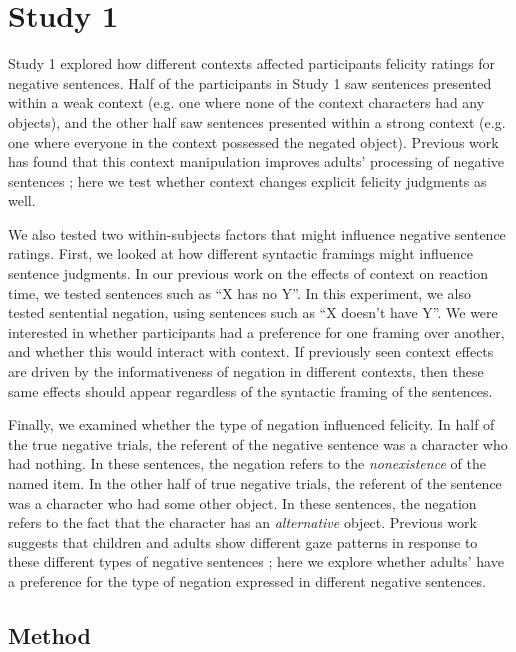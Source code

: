 \documentclass[10pt,letterpaper]{article}
\begin{document}
\section{Study 1}

Study 1 explored how different contexts affected participants felicity ratings for negative sentences.  Half of the participants in Study 1 saw sentences presented within a weak context (e.g. one where none of the context characters had any objects), and the other half saw sentences presented within a strong context (e.g. one where everyone in the context possessed the negated object).  Previous work has found that this context manipulation improves adults' processing of negative sentences \cite{nordmeyer2014}; here we test whether context changes explicit felicity judgments as well.  

We also tested two within-subjects factors that might influence negative sentence ratings.  First, we looked at how different syntactic framings might influence sentence judgments.  In our previous work on the effects of context on reaction time, we tested sentences such as ``X has no Y''.  In this experiment, we also tested sentential negation, using sentences such as ``X doesn't have Y''.  We were interested in whether participants had a preference for one framing over another, and whether this would interact with context.  If previously seen context effects are driven by the informativeness of negation in different contexts, then these same effects should appear regardless of the syntactic framing of the sentences.  

Finally, we examined whether the type of negation influenced felicity.  In half of the true negative trials, the referent of the negative sentence was a character who had nothing.  In these sentences, the negation refers to the \emph{nonexistence} of the named item.  In the other half of true negative trials, the referent of the sentence was a character who had some other object.  In these sentences, the negation refers to the fact that the character has an \emph{alternative} object.  Previous work suggests that children and adults show different gaze patterns in response to these different types of negative sentences \cite{nordmeyer2014b}; here we explore whether adults' have a preference for the type of negation expressed in different negative sentences.

\subsection{Method}
\end{document}
